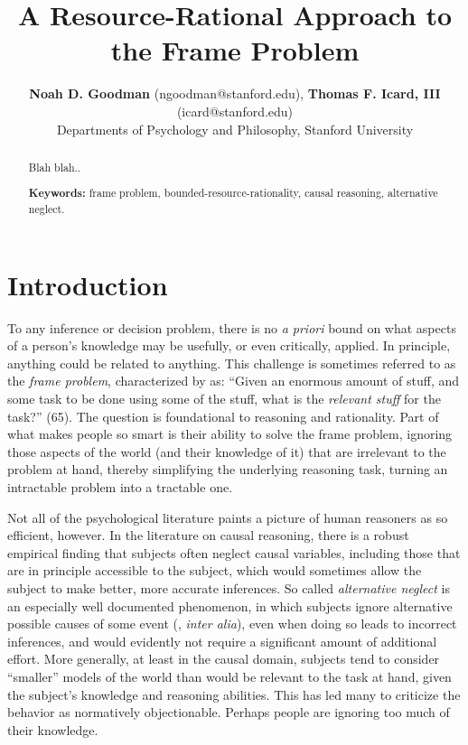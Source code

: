 \documentclass[10pt,letterpaper]{article}
\title{A Resource-Rational Approach to the Frame Problem}
\author{{\large \bf Noah D. Goodman} (ngoodman@stanford.edu), {\large \bf Thomas F. Icard, III} (icard@stanford.edu) \\
  Departments of Psychology and Philosophy, Stanford University}
\begin{document}
\maketitle


\begin{abstract}
Blah blah.. \vspace{2.2in}

\textbf{Keywords:} 
frame problem, bounded-resource-rationality, causal reasoning, alternative neglect.
\end{abstract}

\section{Introduction}

To any inference or decision problem, there is no \emph{a priori} bound on what aspects of a person's knowledge may be usefully, or even critically, applied. In principle, anything could be related to anything. 
This challenge is sometimes referred to as the \emph{frame problem}, characterized by \cite{Glymour1987} as: ``Given an enormous amount of stuff, and some task to be done using some of the stuff, what is the \emph{relevant stuff} for the task?'' (65). The question is foundational to reasoning and rationality. 
Part of what makes people so smart is their ability to solve the frame problem, ignoring those aspects of the world (and their knowledge of it) that are irrelevant to the problem at hand, thereby simplifying the underlying reasoning task, turning an intractable problem into a tractable one.

Not all of the psychological literature paints a picture of human reasoners as so efficient, however. In the literature on causal reasoning, there is a robust empirical finding that subjects often neglect causal variables, including those that are in principle accessible to the subject, which would sometimes allow the subject to make better, more accurate inferences. So called \emph{alternative neglect} is an especially well documented phenomenon, in which subjects ignore alternative possible causes of some event (\citealt{Fischhoff1978,KlaymanHa,Fernbach2011}, \emph{inter alia}), even when doing so leads to incorrect inferences, and would evidently not require a significant  amount of additional effort. More generally, at least in the causal domain, subjects tend to consider ``smaller'' models of the world than would be relevant to the task at hand, given the subject's knowledge and reasoning abilities. This has led many to criticize the behavior as normatively objectionable. Perhaps people are ignoring too much of their knowledge.
\end{document}
